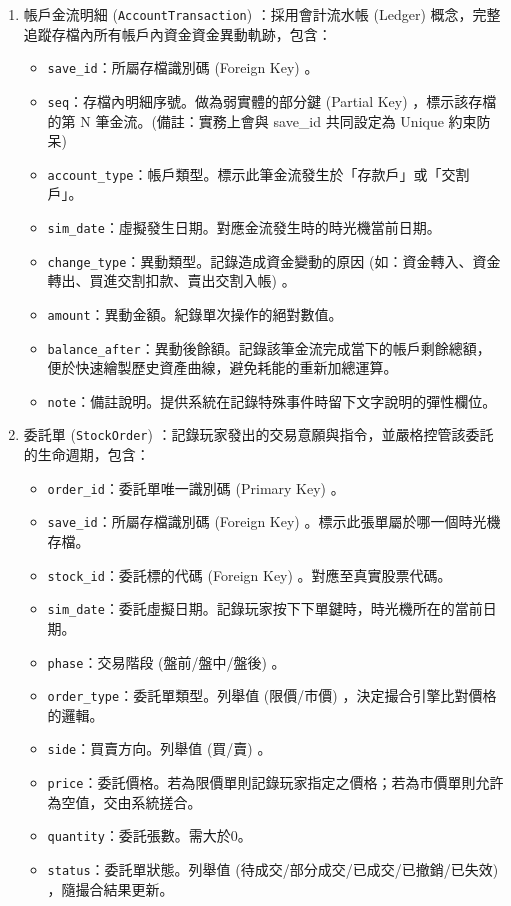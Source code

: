 \documentclass[UTF8, a4paper, 12pt, fontset=none]{ctexart}
\begin{document}
\begin{enumerate}
        \item 帳戶金流明細 (\texttt{AccountTransaction}) ：採用會計流水帳 (Ledger) 概念，完整追蹤存檔內所有帳戶內資金資金異動軌跡，包含：
        \begin{itemize}
            \item \texttt{save\_id}：所屬存檔識別碼 (Foreign Key) 。
            \item \texttt{seq}：存檔內明細序號。做為弱實體的部分鍵 (Partial Key) ，標示該存檔的第 N 筆金流。(備註：實務上會與 save\_id 共同設定為 Unique 約束防呆)
            \item \texttt{account\_type}：帳戶類型。標示此筆金流發生於「存款戶」或「交割戶」。
            \item \texttt{sim\_date}：虛擬發生日期。對應金流發生時的時光機當前日期。
            \item \texttt{change\_type}：異動類型。記錄造成資金變動的原因 (如：資金轉入、資金轉出、買進交割扣款、賣出交割入帳) 。
            \item \texttt{amount}：異動金額。紀錄單次操作的絕對數值。
            \item \texttt{balance\_after}：異動後餘額。記錄該筆金流完成當下的帳戶剩餘總額，便於快速繪製歷史資產曲線，避免耗能的重新加總運算。
            \item \texttt{note}：備註說明。提供系統在記錄特殊事件時留下文字說明的彈性欄位。
        \end{itemize}

        \item 委託單 (\texttt{StockOrder}) ：記錄玩家發出的交易意願與指令，並嚴格控管該委託的生命週期，包含：
        \begin{itemize}
            \item \texttt{order\_id}：委託單唯一識別碼 (Primary Key) 。
            \item \texttt{save\_id}：所屬存檔識別碼 (Foreign Key) 。標示此張單屬於哪一個時光機存檔。
            \item \texttt{stock\_id}：委託標的代碼 (Foreign Key) 。對應至真實股票代碼。
            \item \texttt{sim\_date}：委託虛擬日期。記錄玩家按下下單鍵時，時光機所在的當前日期。
            \item \texttt{phase}：交易階段 (盤前/盤中/盤後) 。
            \item \texttt{order\_type}：委託單類型。列舉值 (限價/市價) ，決定撮合引擎比對價格的邏輯。
            \item \texttt{side}：買賣方向。列舉值 (買/賣) 。
            \item \texttt{price}：委託價格。若為限價單則記錄玩家指定之價格；若為市價單則允許為空值，交由系統搓合。
            \item \texttt{quantity}：委託張數。需大於0。
            \item \texttt{status}：委託單狀態。列舉值 (待成交/部分成交/已成交/已撤銷/已失效) ，隨撮合結果更新。
        \end{itemize}
        

\end{enumerate}
\end{document}
